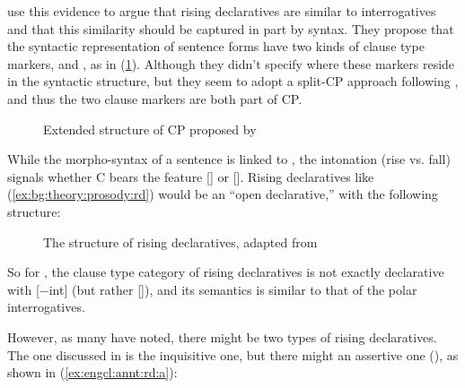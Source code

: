 \textcite{farkasroelofsen2017} use this evidence to argue that rising declaratives are similar to interrogatives and that this similarity should be captured in part by syntax. They propose that the syntactic representation of sentence forms have two kinds of clause type markers,  and , as in (\ref{fig:bg:fb2017}). Although they didn't specify where these markers reside in the syntactic structure, but they seem to adopt a split-CP approach following \textcite{rizzi1997}, and thus the two clause markers are both part of CP. 


\begin{figure}[H]
\begin{center}
\end{center}
\caption{Extended structure of CP proposed by \textcite{farkasroelofsen2017}}
\label{fig:bg:fb2017}
\end{figure}

While the morpho-syntax of a sentence is linked to , the intonation (rise vs. fall) signals whether C bears the feature [] or []. Rising declaratives like (\ref{ex:bg:theory:prosody:rd}) would be an ``open declarative,'' with the following structure:

\begin{figure}[H]
\begin{center}
\end{center}
\caption{The structure of rising declaratives, adapted from \textcite{farkasroelofsen2017}}
\label{fig:bg:fb2017rd}
\end{figure}

So for \textcite{farkasroelofsen2017}, the clause type category of rising declaratives is not exactly declarative with [$-$int] (but rather []), and its semantics is similar to that of the polar interrogatives. 

However, as many have noted, there might be two types of rising declaratives. The one discussed in \textcite{farkasroelofsen2017} is the inquisitive one, but there might an assertive one (\cite{jeong2018, goodhue2021rd}), as shown in (\ref{ex:engcl:annt:rd:a}):

